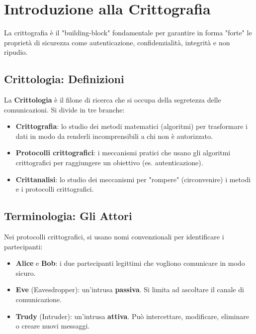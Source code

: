 \documentclass[../main.tex]{subfiles}
\begin{document}
\section{Introduzione alla Crittografia}
La crittografia è il "building-block" fondamentale per garantire in forma "forte" le proprietà di sicurezza come autenticazione, confidenzialità, integrità e non ripudio.

\subsection{Crittologia: Definizioni}
La \textbf{Crittologia} è il filone di ricerca che si occupa della segretezza delle comunicazioni. Si divide in tre branche:
\begin{itemize}
    \item \textbf{Crittografia}: lo studio dei metodi matematici (algoritmi) per trasformare i dati in modo da renderli incomprensibili a chi non è autorizzato.
    \item \textbf{Protocolli crittografici}: i meccanismi pratici che usano gli algoritmi crittografici per raggiungere un obiettivo (es. autenticazione).
    \item \textbf{Crittanalisi}: lo studio dei meccanismi per "rompere" (circonvenire) i metodi e i protocolli crittografici.
\end{itemize}

\subsection{Terminologia: Gli Attori}
Nei protocolli crittografici, si usano nomi convenzionali per identificare i partecipanti:
\begin{itemize}
    \item \textbf{Alice} e \textbf{Bob}: i due partecipanti legittimi che vogliono comunicare in modo sicuro.
    \item \textbf{Eve} (Eavesdropper): un'intrusa \textbf{passiva}. Si limita ad ascoltare il canale di comunicazione.
    \item \textbf{Trudy} (Intruder): un'intrusa \textbf{attiva}. Può intercettare, modificare, eliminare o creare nuovi messaggi.
\end{itemize}

\end{document}
